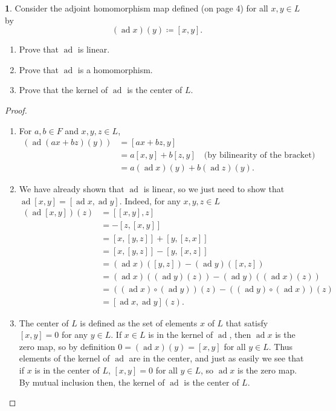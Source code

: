 \documentclass[12pt]{article}
\DeclareMathOperator{\ad}{ad}
\theoremstyle{definition}
\newtheorem{ex}{}
\begin{document}
\begin{ex}
	Consider the adjoint homomorphism map defined (on page 4) for all $x, y \in L$ by \begin{equation*}
		(\ad x)(y) \coloneq [x, y].
	\end{equation*}
	\begin{enumerate}[label=(\alph*)]
		\item Prove that $\ad$ is linear.
		\item Prove that $\ad$ is a homomorphism.
		\item Prove that the kernel of $\ad$ is the center of $L$.
	\end{enumerate}
\end{ex}
\begin{proof}\
	\begin{enumerate}[label=(\alph*)]
		\item For $a, b \in F$ and $x, y, z \in L$, \begin{align*}
			      (\ad (ax + bz)(y)) & = [ax + bz, y]                                                          \\
			                         & = a[x, y] + b[z, y] \hspace{1em} \text{(by bilinearity of the bracket)} \\
			                         & = a(\ad x)(y) + b(\ad z)(y).
		      \end{align*}
		\item We have already shown that $\ad$ is linear, so we just need to show that $\ad[x, y] = [\ad x, \ad y]$.
		      Indeed, for any $x, y, z \in L$ \begin{align*}
			      (\ad[x, y])(z) & = [[x, y], z]                                             \\
			                     & = - [z, [x, y]]                                           \\
			                     & = [x, [y, z]] + [y, [z, x]]                               \\
			                     & = [x, [y, z]] -  [y, [x, z]]                              \\
			                     & = (\ad x) ([y, z]) - (\ad y) ([x, z])                     \\
			                     & = (\ad x) ((\ad y)(z)) - (\ad y) ((\ad x)(z))             \\
			                     & = ((\ad x) \circ (\ad y))(z) - ((\ad y) \circ (\ad x))(z) \\
			                     & = [\ad x, \ad y](z).
		      \end{align*}
		\item The center of $L$ is defined as the set of elements $x$ of $L$ that satisfy $[x, y] = 0$ for any $y \in L$.
		      If $x \in L$ is in the kernel of $\ad$, then $\ad x$ is the zero map, so by definition $0 = (\ad x)(y) = [x, y]$ for all $y \in L$.
		      Thus elements of the kernel of $\ad$ are in the center, and just as easily we see that if $x$ is in the center of $L$, $[x, y] = 0$ for all $y \in L$, so $\ad x$ is the zero map.
		      By mutual inclusion then, the kernel of $\ad$ is the center of $L$.
	\end{enumerate}
\end{proof}
\end{document}

